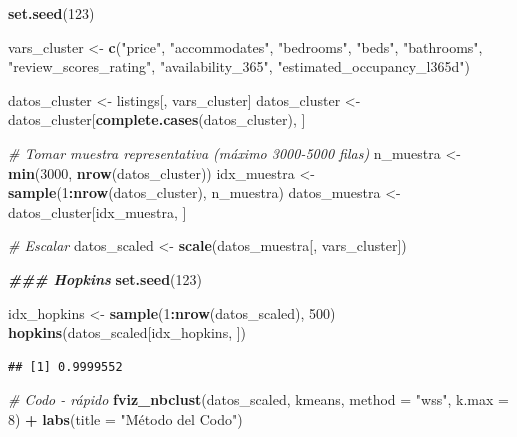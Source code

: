 \documentclass[
]{article}
\newenvironment{Shaded}{\begin{snugshade}}{\end{snugshade}}
\newcommand{\AttributeTok}[1]{\textcolor[rgb]{0.13,0.29,0.53}{#1}}
\newcommand{\CommentTok}[1]{\textcolor[rgb]{0.56,0.35,0.01}{\textit{#1}}}
\newcommand{\DecValTok}[1]{\textcolor[rgb]{0.00,0.00,0.81}{#1}}
\newcommand{\DocumentationTok}[1]{\textcolor[rgb]{0.56,0.35,0.01}{\textbf{\textit{#1}}}}
\newcommand{\FunctionTok}[1]{\textcolor[rgb]{0.13,0.29,0.53}{\textbf{#1}}}
\newcommand{\NormalTok}[1]{#1}
\newcommand{\OtherTok}[1]{\textcolor[rgb]{0.56,0.35,0.01}{#1}}
\newcommand{\SpecialCharTok}[1]{\textcolor[rgb]{0.81,0.36,0.00}{\textbf{#1}}}
\newcommand{\StringTok}[1]{\textcolor[rgb]{0.31,0.60,0.02}{#1}}
\begin{document}
\begin{Shaded}
\begin{Highlighting}[]
\FunctionTok{set.seed}\NormalTok{(}\DecValTok{123}\NormalTok{)}

\NormalTok{vars\_cluster }\OtherTok{\textless{}{-}} \FunctionTok{c}\NormalTok{(}\StringTok{"price"}\NormalTok{, }\StringTok{"accommodates"}\NormalTok{, }\StringTok{"bedrooms"}\NormalTok{, }\StringTok{"beds"}\NormalTok{, }
                  \StringTok{"bathrooms"}\NormalTok{, }\StringTok{"review\_scores\_rating"}\NormalTok{, }
                  \StringTok{"availability\_365"}\NormalTok{, }\StringTok{"estimated\_occupancy\_l365d"}\NormalTok{)}

\NormalTok{datos\_cluster }\OtherTok{\textless{}{-}}\NormalTok{ listings[, vars\_cluster]}
\NormalTok{datos\_cluster }\OtherTok{\textless{}{-}}\NormalTok{ datos\_cluster[}\FunctionTok{complete.cases}\NormalTok{(datos\_cluster), ]}

\CommentTok{\# Tomar muestra representativa (máximo 3000{-}5000 filas)}
\NormalTok{n\_muestra }\OtherTok{\textless{}{-}} \FunctionTok{min}\NormalTok{(}\DecValTok{3000}\NormalTok{, }\FunctionTok{nrow}\NormalTok{(datos\_cluster))}
\NormalTok{idx\_muestra }\OtherTok{\textless{}{-}} \FunctionTok{sample}\NormalTok{(}\DecValTok{1}\SpecialCharTok{:}\FunctionTok{nrow}\NormalTok{(datos\_cluster), n\_muestra)}
\NormalTok{datos\_muestra }\OtherTok{\textless{}{-}}\NormalTok{ datos\_cluster[idx\_muestra, ]}

\CommentTok{\# Escalar}
\NormalTok{datos\_scaled }\OtherTok{\textless{}{-}} \FunctionTok{scale}\NormalTok{(datos\_muestra[, vars\_cluster])}

\DocumentationTok{\#\#\# Hopkins}
\FunctionTok{set.seed}\NormalTok{(}\DecValTok{123}\NormalTok{)}

\NormalTok{idx\_hopkins }\OtherTok{\textless{}{-}} \FunctionTok{sample}\NormalTok{(}\DecValTok{1}\SpecialCharTok{:}\FunctionTok{nrow}\NormalTok{(datos\_scaled), }\DecValTok{500}\NormalTok{)}
\FunctionTok{hopkins}\NormalTok{(datos\_scaled[idx\_hopkins, ])}
\end{Highlighting}
\end{Shaded}

\begin{verbatim}
## [1] 0.9999552
\end{verbatim}

\begin{Shaded}
\begin{Highlighting}[]
\CommentTok{\# Codo {-} rápido}
\FunctionTok{fviz\_nbclust}\NormalTok{(datos\_scaled, kmeans, }
             \AttributeTok{method =} \StringTok{"wss"}\NormalTok{,}
             \AttributeTok{k.max =} \DecValTok{8}\NormalTok{) }\SpecialCharTok{+}
  \FunctionTok{labs}\NormalTok{(}\AttributeTok{title =} \StringTok{"Método del Codo"}\NormalTok{)}
\end{Highlighting}
\end{Shaded}
\end{document}
